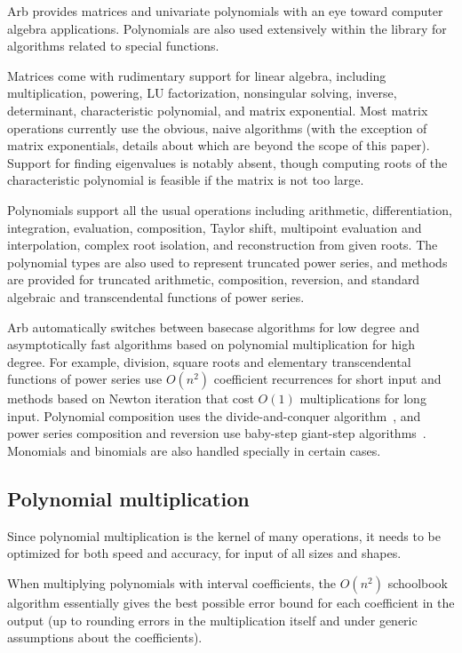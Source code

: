\documentclass[10pt,journal,compsoc,cspaper]{IEEEtran}
\begin{document}
Arb provides matrices and univariate polynomials
with an eye toward computer algebra applications.
Polynomials are also used extensively within the library
for algorithms related to special functions.

Matrices come with rudimentary support for linear algebra,
including multiplication, powering,
LU factorization, nonsingular solving, inverse,
determinant, characteristic polynomial, and matrix exponential.
Most matrix operations currently
use the obvious, naive algorithms
(with the exception of matrix exponentials,
details about which are beyond the scope of this paper).
Support for finding eigenvalues is notably absent,
though computing roots of the characteristic polynomial
is feasible if the matrix is not too large.

Polynomials support all the usual operations
including arithmetic, differentiation, integration, evaluation, composition,
Taylor shift,
multipoint evaluation and interpolation,
complex root isolation, and reconstruction from given roots.
The polynomial types are also used to represent truncated power series,
and methods are provided for
truncated arithmetic, composition, reversion,
and standard algebraic and transcendental functions of power series.

Arb automatically switches between basecase algorithms for
low degree and asymptotically fast algorithms based on
polynomial multiplication for high degree.
For example, division, square roots and
elementary transcendental functions of power series use
$O(n^2)$ coefficient recurrences for short input
and methods based on Newton iteration
that cost $O(1)$ multiplications for long input.
Polynomial composition uses the divide-and-conquer algorithm~\cite{Hart2011practical},
and power series composition and reversion use
baby-step giant-step algorithms~\cite{BrentKung1978,Johansson2015reversion}.
Monomials and binomials are also handled specially in certain cases.

\subsection{Polynomial multiplication}

Since polynomial multiplication is the kernel
of many operations, it needs to be optimized for
both speed and accuracy, for input of all sizes and shapes.

When multiplying polynomials with interval coefficients, the $O(n^2)$
schoolbook algorithm essentially gives the best possible error bound
for each coefficient in the output (up to rounding errors
in the multiplication itself and under generic assumptions about
the coefficients).
\end{document}
